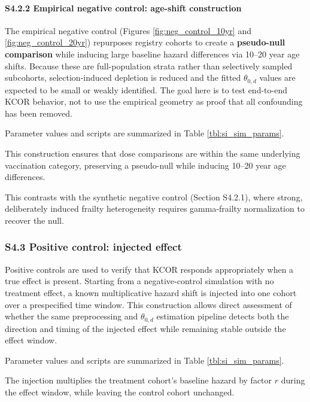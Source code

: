 \documentclass[
]{article}
\begin{document}
\paragraph{S4.2.2 Empirical negative control: age-shift
construction}\label{s4.2.2-empirical-negative-control-age-shift-construction}

The empirical negative control (Figures \ref{fig:neg_control_10yr} and
\ref{fig:neg_control_20yr}) repurposes registry cohorts to create a
\textbf{pseudo-null comparison} while inducing large baseline hazard
differences via 10--20 year age shifts. Because these are
full-population strata rather than selectively sampled subcohorts,
selection-induced depletion is reduced and the fitted \(\theta_{0,d}\)
values are expected to be small or weakly identified. The goal here is
to test end-to-end KCOR behavior, not to use the empirical geometry as
proof that all confounding has been removed.

Parameter values and scripts are summarized in Table
\ref{tbl:si_sim_params}.

This construction ensures that dose comparisons are within the same
underlying vaccination category, preserving a pseudo-null while inducing
10--20 year age differences.

This contrasts with the synthetic negative control (Section S4.2.1),
where strong, deliberately induced frailty heterogeneity requires
gamma-frailty normalization to recover the null.

\subsubsection{S4.3 Positive control: injected
effect}\label{s4.3-positive-control-injected-effect}

Positive controls are used to verify that KCOR responds appropriately
when a true effect is present. Starting from a negative-control
simulation with no treatment effect, a known multiplicative hazard shift
is injected into one cohort over a prespecified time window. This
construction allows direct assessment of whether the same preprocessing
and \(\theta_{0,d}\) estimation pipeline detects both the direction and
timing of the injected effect while remaining stable outside the effect
window.

Parameter values and scripts are summarized in Table
\ref{tbl:si_sim_params}.

The injection multiplies the treatment cohort's baseline hazard by
factor \(r\) during the effect window, while leaving the control cohort
unchanged.
\end{document}
